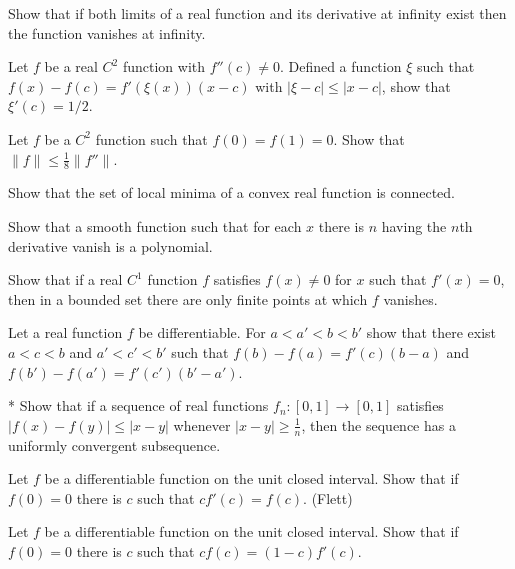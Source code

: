 \documentclass[12pt]{article}
\begin{document}
	\begin{prb}
	Show that if both limits of a real function and its derivative at infinity exist then the function vanishes at infinity.
	\end{prb}

	\begin{prb}
	Let $f$ be a real $C^2$ function with $f''(c)\ne0$. Defined a function $\xi$ such that $f(x)-f(c)=f'(\xi(x))(x-c)$ with $|\xi-c|\le|x-c|$, show that $\xi'(c)=1/2$.
	\end{prb}

	\begin{prb}
	Let $f$ be a $C^2$ function such that $f(0)=f(1)=0$. Show that $\|f\|\le\frac18\|f''\|$.
	\end{prb}

	\begin{prb}
	Show that the set of local minima of a convex real function is connected.
	\end{prb}

	\begin{prb}
	Show that a smooth function such that for each $x$ there is $n$ having the $n$th derivative vanish is a polynomial.
	\end{prb}

	\begin{prb}
	Show that if a real $C^1$ function $f$ satisfies $f(x)\ne0$ for $x$ such that $f'(x)=0$, then in a bounded set there are only finite points at which $f$ vanishes.
	\end{prb}

	\begin{prb}
	Let a real function $f$ be differentiable. For $a<a'<b<b'$ show that there exist $a<c<b$ and $a'<c'<b'$ such that $f(b)-f(a)=f'(c)(b-a)$ and $f(b')-f(a')=f'(c')(b'-a')$.
	\end{prb}

	\begin{prb}*
	Show that if a sequence of real functions $f_n\colon[0,1]\to[0,1]$ satisfies $|f(x)-f(y)|\le|x-y|$ whenever $|x-y|\ge\frac1n$, then the sequence has a uniformly convergent subsequence.
	\end{prb}

	\begin{prb}
	Let $f$ be a differentiable function on the unit closed interval. Show that if $f(0)=0$ there is $c$ such that $cf'(c)=f(c)$. (Flett)
	\end{prb}

	\begin{prb}
	Let $f$ be a differentiable function on the unit closed interval. Show that if $f(0)=0$ there is $c$ such that $cf(c)=(1-c)f'(c)$.
	\end{prb}
\end{document}
